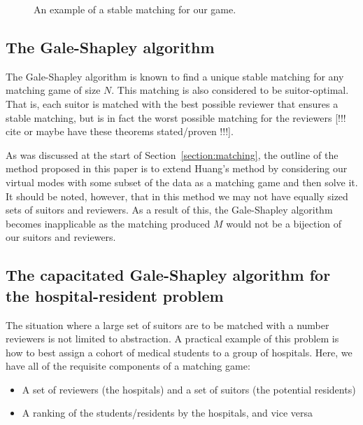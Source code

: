 \begin{example}
\begin{figure}[h]
    \caption{An example of a stable matching for our game.}\label{%
        fig:stable-matching}
    \end{figure}
\end{example}

\subsection{The Gale-Shapley algorithm}\label{subsection:galeshapley}

The Gale-Shapley algorithm is known to find a unique stable matching for any 
matching game of size \(N\). This matching is also considered to be 
suitor-optimal. That is, each suitor is matched with the best possible reviewer
that ensures a stable matching, but is in fact the worst possible matching for 
the reviewers [!!! cite or maybe have these theorems stated/proven !!!]. 

As was discussed at the start of Section~\ref{section:matching}, the outline of
the method proposed in this paper is to extend Huang's method by considering our
virtual modes with some subset of the data as a matching game and then solve it.
It should be noted, however, that in this method we may not have equally sized 
sets of suitors and reviewers. As a result of this, the Gale-Shapley algorithm 
becomes inapplicable as the matching produced \(M\) would not be a bijection of 
our suitors and reviewers.

\subsection{The capacitated Gale-Shapley algorithm for the hospital-resident 
		problem}\label{subsection:capacitated-galeshapley}

The situation where a large set of suitors are to be matched with a number
reviewers is not limited to abstraction. A practical example of this problem is
how to best assign a cohort of medical students to a group of hospitals. Here, 
we have all of the requisite components of a matching game:

\begin{itemize}
	\item A set of reviewers (the hospitals) and a set of suitors (the potential
        residents) 
	\item A ranking of the students/residents by the hospitals, and vice versa
\end{itemize}

